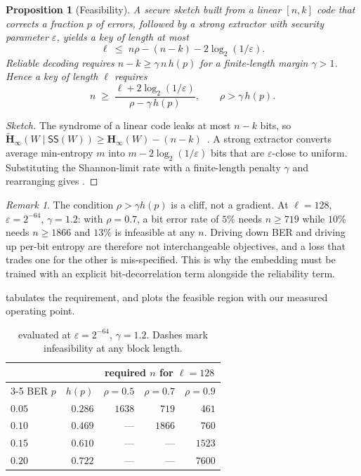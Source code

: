 \documentclass[10pt,twocolumn]{article}
\newtheorem{proposition}{Proposition}
\theoremstyle{remark}
\newtheorem{remark}{Remark}
\newcommand{\hinf}{\mathbf{H}_\infty}
\newcommand{\hinft}{\widetilde{\mathbf{H}}_\infty}
\begin{document}
\begin{proposition}[Feasibility]
\label{prop:feas}
A secure sketch built from a linear $[n,k]$ code that corrects a fraction $p$ of
errors, followed by a strong extractor with security parameter $\varepsilon$,
yields a key of length at most
\begin{equation}
\ell \;\leq\; n\rho - (n-k) - 2\log_2(1/\varepsilon).
\end{equation}
Reliable decoding requires $n-k \geq \gamma\, n\, h(p)$ for a finite-length
margin $\gamma > 1$. Hence a key of length $\ell$ requires
\begin{equation}
n \;\geq\; \frac{\ell + 2\log_2(1/\varepsilon)}{\rho - \gamma\, h(p)},
\qquad \rho > \gamma\, h(p).
\label{eq:feas}
\end{equation}
\end{proposition}

\begin{proof}[Sketch]
The syndrome of a linear code leaks at most $n-k$ bits, so
$\hinft(W \mid \mathsf{SS}(W)) \geq \hinf(W) - (n-k)$~\cite{dodis2008}. A strong
extractor converts average min-entropy $m$ into $m - 2\log_2(1/\varepsilon)$
bits that are $\varepsilon$-close to uniform. Substituting the Shannon-limit
rate with a finite-length penalty $\gamma$ and rearranging gives
.
\end{proof}

\begin{remark}
The condition $\rho > \gamma h(p)$ is a cliff, not a gradient. At
$\ell = 128$, $\varepsilon = 2^{-64}$, $\gamma = 1.2$: with $\rho = 0.7$, a bit
error rate of $5\%$ needs $n \geq 719$ while $10\%$ needs $n \geq 1866$ and
$13\%$ is infeasible at any $n$. Driving down BER and driving up per-bit entropy
are therefore not interchangeable objectives, and a loss that trades one for the
other is mis-specified. This is why the embedding must be trained with an
explicit bit-decorrelation term alongside the reliability term.
\end{remark}

 tabulates the requirement, and  plots the
feasible region with our measured operating point.

\begin{table}[t]
\centering
\small
\setlength{\tabcolsep}{6pt}
\renewcommand{\arraystretch}{1.12}
\begin{tabular}{lrrrr}
\toprule
& & \multicolumn{3}{c}{required $n$ for $\ell=128$} \\
\cmidrule(l){3-5}
BER $p$ & $h(p)$ & $\rho{=}0.5$ & $\rho{=}0.7$ & $\rho{=}0.9$ \\
\midrule
$0.05$ & $0.286$ & $1638$ & $719$  & $461$ \\
$0.10$ & $0.469$ & ---    & $1866$ & $760$ \\
$0.15$ & $0.610$ & ---    & ---    & $1523$ \\
$0.20$ & $0.722$ & ---    & ---    & $7600$ \\
\bottomrule
\end{tabular}
\caption{ evaluated at $\varepsilon=2^{-64}$, $\gamma=1.2$.
Dashes mark infeasibility at any block length.}
\label{tab:feas}
\end{table}
\end{document}
